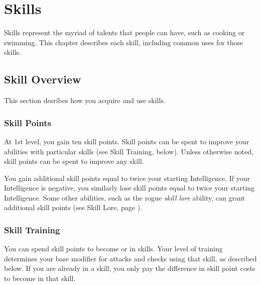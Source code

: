\chapter{Skills}\label{Skills}

Skills represent the myriad of talents that people can have, such as cooking or swimming.
This chapter describes each skill, including common uses for those skills.

\section{Skill Overview}

    This section desribes how you acquire and use skills.

    \subsection{Skill Points}\label{Skill Points}

        At 1st level, you gain ten skill points.
        Skill points can be spent to improve your abilities with particular skills (see Skill Training, below).
        Unless otherwise noted, skill points can be spent to improve any skill.

        You gain additional skill points equal to twice your starting Intelligence.
        If your Intelligence is negative, you similarly lose skill points equal to twice your starting Intelligence.
        Some other abilities, such as the rogue \textit{skill lore} ability, can grant additional skill points (see Skill Lore, page ).

    \subsection{Skill Training}\label{Skill Training}

        You can spend skill points to become  or  in skills.
        Your level of training determines your base modifier for attacks and checks using that skill, as described below.
        If you are already  in a skill, you only pay the difference in skill point costs to become  in that skill.

